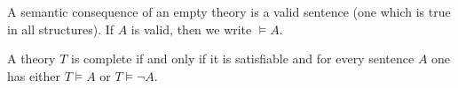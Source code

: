 \begin{page}

\begin{exl}
A semantic consequence of an empty theory is a valid sentence (one which is true in all structures).
If $A$ is valid, then we write $\vDash A$.
\end{exl}

\end{page}

\begin{page}

\begin{lem}
A theory $T$ is complete if and only if it is satisfiable and for every sentence $A$ one has either $T \vDash A$ or $T \vDash \neg A$.
\end{lem}

\end{page}

